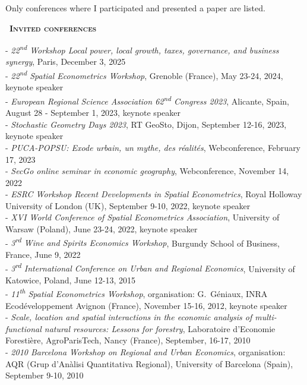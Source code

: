 \documentclass[a4paper,12pt]{article}
\newcommand{\smalltitre}[1]{%
	\noindent \textbullet~\textsc{\textbf{#1}}
	\smallskip
	}
\begin{document}
\noindent Only conferences where I participated and presented a paper are listed. \bigskip


\smalltitre{Invited conferences}

\noindent - \textit{22\textsuperscript{nd} Workshop Local power, local growth, taxes, governance, and business synergy}, Paris, December 3, 2025\\
- \textit{22\textsuperscript{nd} Spatial Econometrics Workshop}, Grenoble (France), May 23-24, 2024, keynote speaker\\
- \textit{European Regional Science Association 62\textsuperscript{nd} Congress 2023}, Alicante, Spain, August 28 - September 1, 2023, keynote speaker \\
 - \textit{Stochastic Geometry Days 2023}, RT GeoSto, Dijon, September 12-16, 2023, keynote speaker \\
- \textit{PUCA-POPSU: Exode urbain, un mythe, des réalités}, Webconference, February 17, 2023 \\
- \textit{SecGo online seminar in economic geography}, Webconference, November 14, 2022 \\
- \textit{ESRC Workshop Recent Developments in Spatial Econometrics}, Royal Holloway University of London (UK), September 9-10, 2022, keynote speaker \\
- \textit{XVI World Conference of Spatial Econometrics Association}, University of Warsaw (Poland), June 23-24, 2022, keynote speaker \\
- \textit{3\textsuperscript{rd} Wine and Spirits Economics Workshop}, Burgundy School of Business, France, June 9, 2022 \\
- \textit{3\textsuperscript{rd} International Conference on Urban and Regional Economics}, University of Katowice, Poland, June 12-13, 2015 \\
- \textit{11\textsuperscript{th} Spatial Econometrics Workshop}, organisation: G.~Géniaux, INRA Ecodéveloppement Avignon (France), November 15-16, 2012, keynote speaker \\
- \textit{Scale, location and spatial interactions in the economic analysis of multi-functional natural resources: Lessons for forestry}, Laboratoire d'Economie Forestière, AgroParisTech, Nancy (France), September, 16-17, 2010 \\
- \textit{2010 Barcelona Workshop on Regional and Urban Economics}, organisation: AQR (Grup d'Anàlisi Quantitativa Regional), University of Barcelona (Spain), September 9-10, 2010 \\
\end{document}
